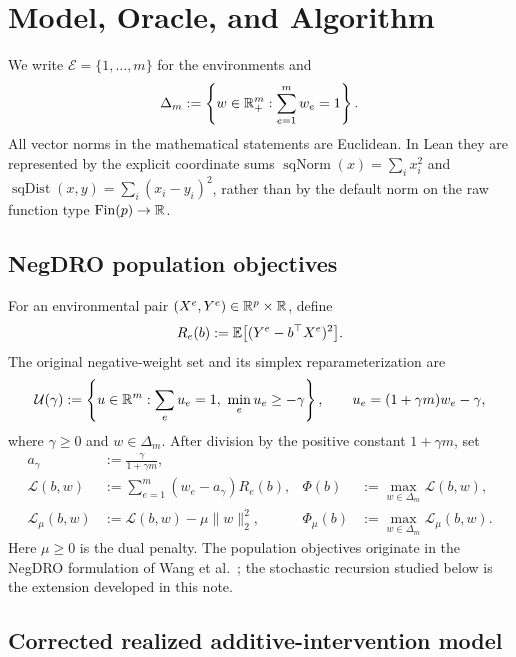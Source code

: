 \section{Model, Oracle, and Algorithm}
\label{sec:setup}

We write $\mathcal E=\{1,\ldots,m\}$ for the environments and
\[
  \Delta_m:=\left\{w\in\mathbb{R}_+^m:\sum_{e=1}^m w_e=1\right\}.
\]
All vector norms in the mathematical statements are Euclidean.  In Lean they
are represented by the explicit coordinate sums
$\operatorname{sqNorm}(x)=\sum_i x_i^2$ and
$\operatorname{sqDist}(x,y)=\sum_i(x_i-y_i)^2$, rather than by the default
norm on the raw function type $\operatorname{Fin}(p)\to\mathbb{R}$.

\subsection{NegDRO population objectives}

For an environmental pair $(X^e,Y^e)\in\mathbb{R}^p\times\mathbb{R}$, define
\begin{equation}
  R_e(b):=\mathbb{E}\bigl[(Y^e-b^\top X^e)^2\bigr].
  \label{eq:population-risk}
\end{equation}
The original negative-weight set and its simplex reparameterization are
\[
  \mathcal U(\gamma)
  :=\left\{u\in\mathbb{R}^m:\sum_eu_e=1,\ \min_eu_e\ge-\gamma\right\},
  \qquad
  u_e=(1+\gamma m)w_e-\gamma,
\]
where $\gamma\ge0$ and $w\in\Delta_m$.  After division by the positive
constant $1+\gamma m$, set
\begin{align}
  a_\gamma&:=\frac{\gamma}{1+\gamma m},
  \label{eq:a-gamma}\\
  \mathcal L(b,w)&:=\sum_{e=1}^m(w_e-a_\gamma)R_e(b),
  &\Phi(b)&:=\max_{w\in\Delta_m}\mathcal L(b,w),
  \label{eq:unpenalized-negdro}\\
  \mathcal L_\mu(b,w)&:=\mathcal L(b,w)-\mu\|w\|_2^2,
  &\Phi_\mu(b)&:=\max_{w\in\Delta_m}\mathcal L_\mu(b,w).
  \label{eq:penalized-negdro}
\end{align}
Here $\mu\ge0$ is the dual penalty.  The population objectives originate in
the NegDRO formulation of Wang et al.~\cite{wang2026negdro}; the stochastic
recursion studied below is the extension developed in this note.

\subsection{Corrected realized additive-intervention model}
\label{subsec:corrected-reduced-form}

